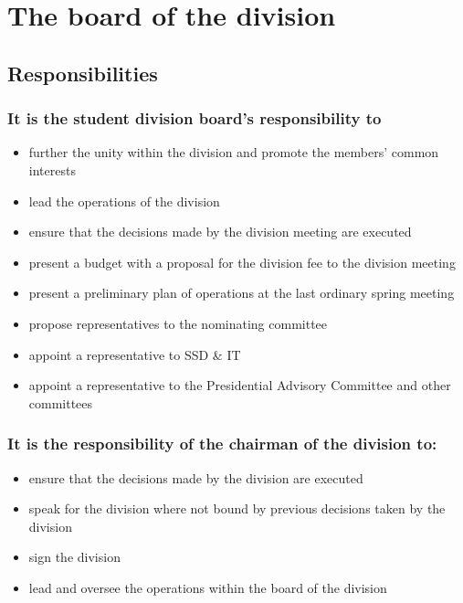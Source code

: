 \section{The board of the division}

\subsection{Responsibilities}

\subsubsection{It is the student division board's responsibility to}

\begin{itemize}
  \item further the unity within the division and promote the members' common interests
  \item lead the operations of the division 
  \item ensure that the decisions made by the division meeting are executed  
  \item present a budget with a proposal for the division fee to the division meeting 
  \item present a preliminary plan of operations at the last ordinary spring meeting 
  \item propose representatives to the nominating committee 
  \item appoint a representative to SSD \& IT 
  \item appoint a representative to the Presidential Advisory Committee and other committees 
\end{itemize}

\subsubsection{It is the responsibility of the chairman of the division to:} 

\begin{itemize}
  \item ensure that the decisions made by the division are executed  
  \item speak for the division where not bound by previous decisions taken by the division
  \item sign the division %
  \item lead and oversee the operations within the board of the division
\end{itemize}

